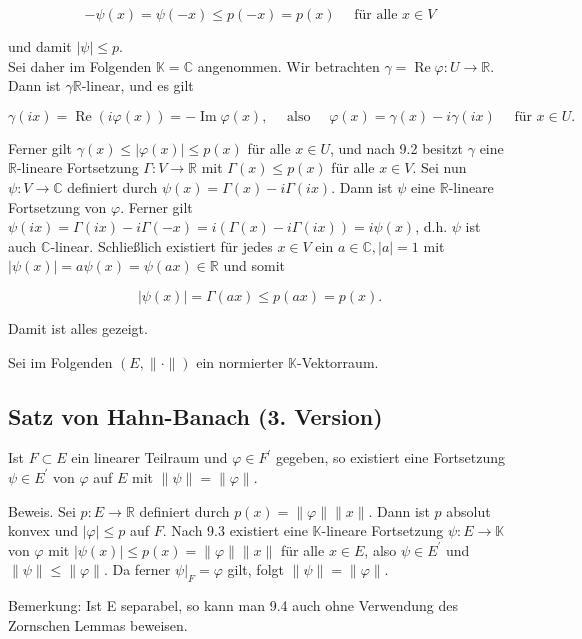 \documentclass[10pt, letterpaper]{article}
\begin{document}
$$
-\psi(x)=\psi(-x) \leq p(-x)=p(x) \quad \text { für alle } x \in V
$$

und damit $|\psi| \leq p$.\\
Sei daher im Folgenden $\mathbb{K}=\mathbb{C}$ angenommen. Wir betrachten $\gamma=\operatorname{Re} \varphi: U \rightarrow \mathbb{R}$. Dann ist $\gamma \mathbb{R}$-linear, und es gilt

$$
\gamma(i x)=\operatorname{Re}(i \varphi(x))=-\operatorname{Im} \varphi(x), \quad \text { also } \quad \varphi(x)=\gamma(x)-i \gamma(i x) \quad \text { für } x \in U .
$$

Ferner gilt $\gamma(x) \leq|\varphi(x)| \leq p(x)$ für alle $x \in U$, und nach 9.2 besitzt $\gamma$ eine $\mathbb{R}$-lineare Fortsetzung $\Gamma: V \rightarrow \mathbb{R}$ mit $\Gamma(x) \leq p(x)$ für alle $x \in V$. Sei nun $\psi: V \rightarrow \mathbb{C}$ definiert durch $\psi(x)=\Gamma(x)-i \Gamma(i x)$. Dann ist $\psi$ eine $\mathbb{R}$-lineare Fortsetzung von $\varphi$. Ferner gilt $\psi(i x)=\Gamma(i x)-i \Gamma(-x)=i(\Gamma(x)-i \Gamma(i x))=i \psi(x)$, d.h. $\psi$ ist auch $\mathbb{C}$-linear. Schließlich existiert für jedes $x \in V$ ein $a \in \mathbb{C},|a|=1$ mit $|\psi(x)|=a \psi(x)=\psi(a x) \in \mathbb{R}$ und somit

$$
|\psi(x)|=\Gamma(a x) \leq p(a x)=p(x) .
$$

Damit ist alles gezeigt.

Sei im Folgenden $(E,\|\cdot\|)$ ein normierter $\mathbb{K}$-Vektorraum.

\subsection*{Satz von Hahn-Banach (3. Version)}
Ist $F \subset E$ ein linearer Teilraum und $\varphi \in F^{\prime}$ gegeben, so existiert eine Fortsetzung $\psi \in E^{\prime}$ von $\varphi$ auf $E$ mit $\|\psi\|=\|\varphi\|$.

Beweis. Sei $p: E \rightarrow \mathbb{R}$ definiert durch $p(x)=\|\varphi\|\|x\|$. Dann ist $p$ absolut konvex und $|\varphi| \leq p$ auf $F$. Nach 9.3 existiert eine $\mathbb{K}$-lineare Fortsetzung $\psi: E \rightarrow \mathbb{K}$ von $\varphi$ mit $|\psi(x)| \leq p(x)=\|\varphi\|\|x\|$ für alle $x \in E$, also $\psi \in E^{\prime}$ und $\|\psi\| \leq\|\varphi\|$. Da ferner $\left.\psi\right|_{F}=\varphi$ gilt, folgt $\|\psi\|=\|\varphi\|$.

Bemerkung: Ist E separabel, so kann man 9.4 auch ohne Verwendung des Zornschen Lemmas beweisen.
\end{document}
